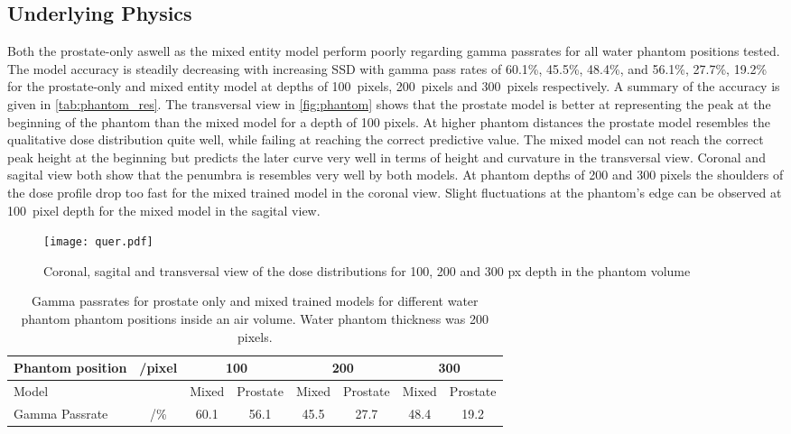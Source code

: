 \subsection{Underlying Physics}

Both the prostate-only aswell as the mixed entity model perform poorly regarding gamma passrates for all water phantom positions tested. 
The model accuracy is steadily decreasing with increasing \acs{SSD} with gamma pass rates of 60.1\%, 45.5\%, 48.4\%, and 56.1\%, 27.7\%, 19.2\% for the prostate-only and mixed entity model at depths of 100~pixels, 200~pixels and 300~pixels respectively. A summary of the accuracy is given in \autoref{tab:phantom_res}. 
The transversal view in \autoref{fig:phantom} shows that the prostate model is better at representing the peak at the beginning of the phantom than the mixed model for a depth of 100 pixels. 
At higher phantom distances the prostate model resembles the qualitative dose distribution quite well, while failing at reaching the correct predictive value. 
The mixed model can not reach the correct peak height at the beginning but predicts the later curve very well in terms of height and curvature in the transversal view. 
Coronal and sagital view both show that the penumbra is resembles very well by both models. 
At phantom depths of 200 and 300 pixels the shoulders of the dose profile drop too fast for the mixed trained model in the coronal view.
Slight fluctuations at the phantom's edge can be observed at 100~pixel depth for the mixed model in the sagital view.
 

\begin{figure}
    \centering
    \texttt{[image: quer.pdf]}
    \caption{Coronal, sagital and transversal view of the dose distributions for 100, 200 and 300 px depth in the phantom volume}\label{fig:phantom}
\end{figure}

\begin{table}
    \begin{tabular}{|lc|cc|cc|cc|}
    \hline
    Phantom position & /pixel & \multicolumn{2}{c|}{\textbf{100}} & \multicolumn{2}{c|}{\textbf{200}} & \multicolumn{2}{c|}{\textbf{300}} \\ \hline
    Model               &        & Mixed          & Prostate         & Mixed          & Prostate         & Mixed          & Prostate         \\
    Gamma Passrate      & /\%    & 60.1         & 56.1           & 45.5         & 27.7           & 48.4         & 19.2           \\ \hline
    \end{tabular}
    \caption{Gamma passrates for prostate only and mixed trained models for different water phantom phantom positions inside an air volume. Water phantom thickness was 200 pixels.}\label{tab:phantom_res}
\end{table}